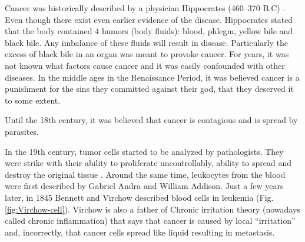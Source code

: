 \documentclass[12pt,]{book}
\theoremstyle{definition}
\theoremstyle{definition}
\theoremstyle{definition}
\theoremstyle{remark}
\begin{document}
Cancer was historically described by a physician Hippocrates (460--370
B.C) \citep{Sudhakar2009}. Even though there exist even earlier evidence
of the disease. Hippocrates stated that the body contained 4 humors
(body fluids): blood, phlegm, yellow bile and black bile. Any imbalance
of these fluids will result in disease. Particularly the excess of black
bile in an organ was meant to provoke cancer. For years, it was not
known what factors cause cancer and it was easily confounded with other
diseases. In the middle ages in the Renaissance Period, it was believed
cancer is a punishment for the sins they committed against their god,
that they deserved it to some extent.

Until the 18th century, it was believed that cancer is contagious and is
spread by parasites.

In the 19th century, tumor cells started to be analyzed by pathologists.
They were strike with their ability to proliferate uncontrollably,
ability to spread and destroy the original tissue \citep{NPR2010}.
Around the same time, leukocytes from the blood were first described by
Gabriel Andra and William Addison. Just a few years later, in 1845
Bennett and Virchow described blood cells in leukemia (Fig.
\ref{fig:Virchow-cell}). Virchow is also a father of Chronic irritation
theory (nowadays called chronic inflammation) that says that cancer is
caused by local ``irritation'' and, incorrectly, that cancer cells
spread like liquid resulting in metastasis.
\end{document}
